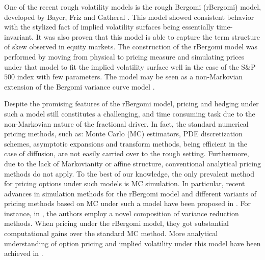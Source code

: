  One of the recent rough volatility models is the rough Bergomi (rBergomi) model, developed by Bayer, Friz and Gatheral \cite{bayer2016pricing}. This model showed   consistent behavior with the stylized fact of implied volatility surfaces being essentially time-invariant. It was also proven that this model 
 is able to capture the term structure of skew observed in equity markets. The construction of the rBergomi model was performed by  moving from  physical to pricing measure and simulating prices under that model to fit  the implied volatility surface well in the case of the S\&P $500$ index with few parameters. The model may be seen as a non-Markovian extension of the Bergomi variance curve model \cite{bergomi2005smile}.
 
Despite the promising features of the rBergomi model, pricing  and hedging under such a model still constitutes a challenging, and time consuming task due  to the non-Markovian nature of the fractional driver. In fact, the standard numerical pricing methods, such as: Monte Carlo (MC) estimators, PDE discretization schemes, asymptotic expansions and transform
methods, being efficient in the case of diffusion, are not easily  carried over to the rough setting. Furthermore,  due to the lack of Markovianity or affine structure, conventional analytical pricing methods  do not apply. To the best of our knowledge, the only prevalent method for pricing  options under such models is MC simulation. In particular,  recent advances in simulation methods for the rBergomi model and different variants of pricing methods based on  MC under such a model   have been proposed in \cite{bayer2016pricing,bayer2017regularity,mccrickerd2017turbocharging,bennedsen2017hybrid,jacquier2018vix}.  For instance, in \cite{mccrickerd2017turbocharging}, the authors employ a novel composition of variance reduction methods. When pricing under the rBergomi model, they got  substantial computational gains  over the standard MC method. More   analytical understanding of option pricing and implied volatility under this model have been achieved  in \cite{jacquier2017pathwise,bayer2017short,forde2017asymptotics}. 


